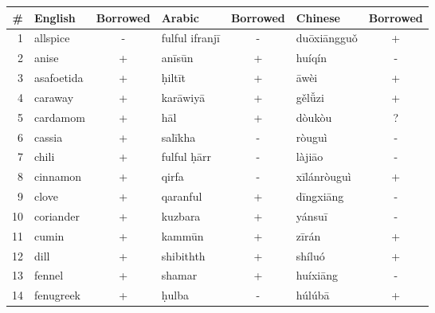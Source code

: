 
\begin{table}[ht]
    \begin{tabular}{@{}rlclclc@{}}
    \toprule
    \textbf{\#} & \textbf{English} & \textbf{Borrowed} & \textbf{Arabic}  & \textbf{Borrowed} & \textbf{Chinese} & \textbf{Borrowed} \\ \midrule
    1           & allspice         & -           & fulful ifranjī   & -           & duōxiāngguǒ      & +           \\
    2           & anise            & +           & anīsūn           & +           & huíqín           & -           \\
    3           & asafoetida       & +           & ḥiltīt           & +           & āwèi             & +           \\
    4           & caraway          & +           & karāwiyā         & +           & gělǚzi           & +           \\
    5           & cardamom         & +           & hāl              & +           & dòukòu           & ?           \\
    6           & cassia           & +           & salīkha          & -           & ròuguì           & -           \\
    7           & chili            & +           & fulful ḥārr      & -           & làjiāo           & -           \\
    8           & cinnamon         & +           & qirfa            & -           & xīlánròuguì      & +           \\
    9           & clove            & +           & qaranful         & +           & dīngxiāng        & -           \\
    10          & coriander        & +           & kuzbara          & +           & yánsuī           & -           \\
    11          & cumin            & +           & kammūn           & +           & zīrán            & +           \\
    12          & dill             & +           & shibithth        & +           & shíluó           & +           \\
    13          & fennel           & +           & shamar           & +           & huíxiāng         & -           \\
    14          & fenugreek        & +           & ḥulba            & -           & húlúbā           & +           \\

\end{tabular}
\end{table}
